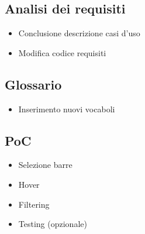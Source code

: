 \subsection{Analisi dei requisiti}
\begin{itemize}
    \item Conclusione descrizione casi d'uso
    \item Modifica codice requisiti
\end{itemize}

\subsection{Glossario}
\begin{itemize}
    \item Inserimento nuovi vocaboli
\end{itemize}

\subsection{PoC}
\begin{itemize}
    \item Selezione barre
    \item Hover
    \item Filtering
    \item Testing (opzionale)
\end{itemize}
